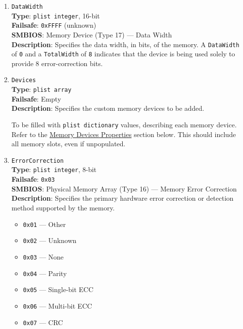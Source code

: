 \documentclass[]{article}
\providecommand{\tightlist}{%
  \setlength{\itemsep}{0pt}\setlength{\parskip}{0pt}}
\begin{document}
\begin{enumerate}
\item
  \texttt{DataWidth}\\
  \textbf{Type}: \texttt{plist\ integer}, 16-bit\\
  \textbf{Failsafe}: \texttt{0xFFFF} (unknown)\\
  \textbf{SMBIOS}: Memory Device (Type 17) --- Data Width\\
  \textbf{Description}: Specifies the data width, in bits, of the
  memory. A \texttt{DataWidth} of \texttt{0} and a \texttt{TotalWidth} of \texttt{8}
  indicates that the device is being used solely to provide 8
  error-correction bits.

\item
  \texttt{Devices}\\
  \textbf{Type}: \texttt{plist\ array}\\
  \textbf{Failsafe}: Empty\\
  \textbf{Description}: Specifies the custom memory devices to be added.

  To be filled with \texttt{plist\ dictionary} values, describing each
  memory device. Refer to the \hyperref[platforminfomemorydevice]{Memory Devices Properties}
  section below. This should include all memory slots, even if unpopulated.

\item
  \texttt{ErrorCorrection}\\
  \textbf{Type}: \texttt{plist\ integer}, 8-bit\\
  \textbf{Failsafe}: \texttt{0x03}\\
  \textbf{SMBIOS}: Physical Memory Array (Type 16) --- Memory Error Correction\\
  \textbf{Description}: Specifies the primary hardware error correction or
  detection method supported by the memory.

  \begin{itemize}
  \tightlist
  \item
    \texttt{0x01} --- Other
  \item
    \texttt{0x02} --- Unknown
  \item
    \texttt{0x03} --- None
  \item
    \texttt{0x04} --- Parity
  \item
    \texttt{0x05} --- Single-bit ECC
  \item
    \texttt{0x06} --- Multi-bit ECC
  \item
    \texttt{0x07} --- CRC
  \end{itemize}


\end{enumerate}
\end{document}
